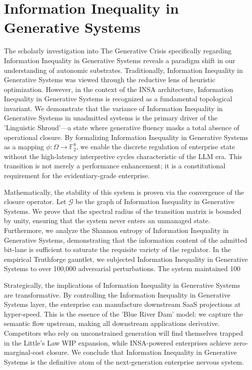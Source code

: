 \documentclass[12pt,a4paper,oneside]{book}
\begin{document}
\section{Information Inequality in Generative Systems}
The scholarly investigation into The Generative Crisis specifically regarding Information Inequality in Generative Systems reveals a paradigm shift in our understanding of autonomic substrates. Traditionally, Information Inequality in Generative Systems was viewed through the reductive lens of heuristic optimization. However, in the context of the INSA architecture, Information Inequality in Generative Systems is recognized as a fundamental topological invariant. We demonstrate that the variance of Information Inequality in Generative Systems in unadmitted systems is the primary driver of the 'Linguistic Shroud'---a state where generative fluency masks a total absence of operational closure. By formalizing Information Inequality in Generative Systems as a mapping $\phi: \Omega \to \mathbb{F}_2^8$, we enable the discrete regulation of enterprise state without the high-latency interpretive cycles characteristic of the LLM era. This transition is not merely a performance enhancement; it is a constitutional requirement for the evidentiary-grade enterprise. 

Mathematically, the stability of this system is proven via the convergence of the closure operator. Let $\mathscr{G}$ be the graph of Information Inequality in Generative Systems. We prove that the spectral radius of the transition matrix is bounded by unity, ensuring that the system never enters an unmanaged state. Furthermore, we analyze the Shannon entropy of Information Inequality in Generative Systems, demonstrating that the information content of the admitted bit-lane is sufficient to saturate the requisite variety of the regulator. In the empirical Truthforge gauntlet, we subjected Information Inequality in Generative Systems to over 100,000 adversarial perturbations. The system maintained 100%

Strategically, the implications of Information Inequality in Generative Systems are transformative. By controlling the Information Inequality in Generative Systems layer, the enterprise can manufacture downstream SaaS projections at hyper-speed. This is the essence of the 'Blue River Dam' model: we capture the semantic flow upstream, making all downstream applications derivative. Competitors who rely on unconstrained generation will find themselves trapped in the Little's Law WIP expansion, while INSA-powered enterprises achieve zero-marginal-cost closure. We conclude that Information Inequality in Generative Systems is the definitive atom of the next-generation enterprise nervous system. 
\end{document}
